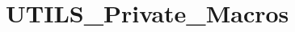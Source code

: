 \hypertarget{group___u_t_i_l_s___private___macros}{}\section{U\+T\+I\+L\+S\+\_\+\+Private\+\_\+\+Macros}
\label{group___u_t_i_l_s___private___macros}
